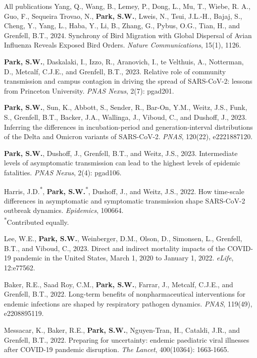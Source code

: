 \documentclass[
	11pt, %
]{resume} %
\begin{document}
\begin{rSection}{All publications}
Yang, Q., Wang, B., Lemey, P., Dong, L., Mu, T., Wiebe, R. A., Guo, F., Sequeira Trovao, N., \textbf{Park, S.W.}, Lweis, N., Tsui, J.L.-H., Bajaj, S., Cheng, Y., Yang, L., Haba, Y., Li, B., Zhang, G., Pybus, O.G., Tian, H., and Grenfell, B.T., 2024. Synchrony of Bird Migration with Global Dispersal of Avian Influenza Reveals Exposed Bird Orders. \textit{Nature Communications}, 15(1), 1126.

\textbf{Park, S.W.}, Daskalaki, I., Izzo, R., Aranovich, I., te Velthuis, A., Notterman, D., Metcalf, C.J.E., and Grenfell, B.T., 2023. Relative role of community transmission and campus contagion in driving the spread of SARS-CoV-2: lessons from Princeton University. \textit{PNAS Nexus}, 2(7): pgad201.

\textbf{Park, S.W.}, Sun, K., Abbott, S., Sender, R., Bar-On, Y.M., Weitz, J.S., Funk, S., Grenfell, B.T., Backer, J.A., Wallinga, J., Viboud, C., and Dushoff, J., 2023. Inferring the differences in incubation-period and generation-interval distributions of the Delta and Omicron variants of SARS-CoV-2. \textit{PNAS}, 120(22), e2221887120.

\textbf{Park, S.W.}, Dushoff, J., Grenfell, B.T., and Weitz, J.S., 2023. Intermediate levels of asymptomatic transmission can lead to the highest levels of epidemic fatalities. \textit{PNAS Nexus}, 2(4): pgad106.

Harris, J.D.\textsuperscript{*}, \textbf{Park, S.W.}\textsuperscript{*}, Dushoff, J., and Weitz, J.S., 2022. How time-scale differences in asymptomatic and symptomatic transmission shape SARS-CoV-2 outbreak dynamics. \textit{Epidemics}, 100664.\\
\textsuperscript{*}Contributed equally.

Lee, W.E., \textbf{Park, S.W.}, Weinberger, D.M., Olson, D., Simonsen, L., Grenfell, B.T., and Viboud, C., 2023. Direct and indirect mortality impacts of the COVID-19 pandemic in the United States, March 1, 2020 to January 1, 2022. \textit{eLife}, 12:e77562.

Baker, R.E., Saad Roy, C.M., \textbf{Park, S.W.}, Farrar, J., Metcalf, C.J.E., and Grenfell, B.T., 2022. Long-term benefits of nonpharmaceutical interventions for endemic infections are shaped by respiratory pathogen dynamics. \textit{PNAS}, 119(49), e2208895119.

Messacar, K., Baker, R.E., \textbf{Park, S.W.}, Nguyen-Tran, H., Cataldi, J.R., and Grenfell, B.T., 2022. Preparing for uncertainty: endemic paediatric viral illnesses after COVID-19 pandemic disruption. \textit{The Lancet}, 400(10364): 1663-1665.


\end{rSection}
\end{document}
